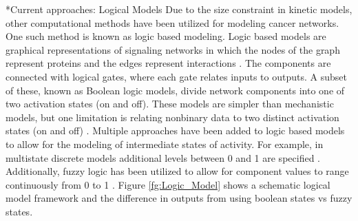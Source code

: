 \documentclass[12pt]{article}
\makeatletter
\renewcommand\section{\@startsection
	{subsection}{2}{0mm}
	{-0.2in}
	{0.05\baselineskip}
	{\normalfont\large\bfseries}}
\makeatother
\begin{document}
\section*{Current approaches: Logical Models}
Due to the size constraint in kinetic models, other computational methods have been utilized for modeling cancer networks. 
One such method is known as logic based modeling. 
Logic based models are graphical representations of signaling networks in which the nodes of the graph represent proteins and the edges represent interactions \cite{Morris2010}. 
The components are connected with logical gates, where each gate relates inputs to outputs. 
A subset of these, known as Boolean logic models, divide network components into one of two activation states (on and off). 
These models are simpler than mechanistic models, but one limitation is relating nonbinary data to two distinct activation states (on and off) \cite{Kholodenko2012}. 
Multiple approaches have been added to logic based models to allow for the modeling of intermediate states of activity. 
For example, in multistate discrete models additional levels between 0 and 1 are specified \cite{Morris2010}. 
Additionally, fuzzy logic has been utilized to allow for component values to range continuously from 0 to 1 \cite{Morris2010}. 
Figure \ref{fg:Logic_Model} shows a schematic logical model framework and the difference in outputs from using boolean states vs fuzzy states. 
\end{document}
